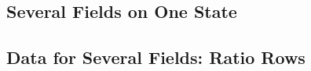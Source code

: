 \subsection{Several Fields on One State}
\label{sec:systems-fields}

\subsection{Data for Several Fields: Ratio Rows}
\label{sec:systems-data}

